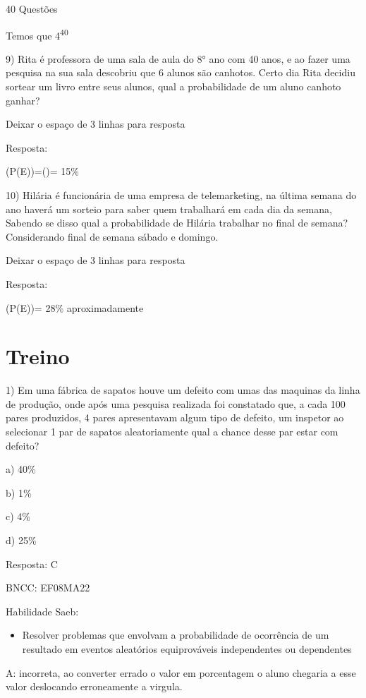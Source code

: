 40 Questões

Temos que 4\textsuperscript{40}

9) Rita é professora de uma sala de aula do 8° ano com 40 anos, e ao
fazer uma pesquisa na sua sala descobriu que 6 alunos são canhotos.
Certo dia Rita decidiu sortear um livro entre seus alunos, qual a
probabilidade de um aluno canhoto ganhar?

Deixar o espaço de 3 linhas para resposta

Resposta:

(P(E))=()= 15\%

10) Hilária é funcionária de uma empresa de telemarketing, na última
semana do ano haverá um sorteio para saber quem trabalhará em cada dia
da semana, Sabendo se disso qual a probabilidade de Hilária trabalhar no
final de semana? Considerando final de semana sábado e domingo.

Deixar o espaço de 3 linhas para resposta

Resposta:

(P(E))= 28\% aproximadamente

\section{Treino}

1) Em uma fábrica de sapatos houve um defeito com umas das maquinas da
linha de produção, onde após uma pesquisa realizada foi constatado que,
a cada 100 pares produzidos, 4 pares apresentavam algum tipo de defeito,
um inspetor ao selecionar 1 par de sapatos aleatoriamente qual a chance
desse par estar com defeito?

a) 40\%

b) 1\%

c) 4\%

d) 25\%

Resposta: C

BNCC: EF08MA22

Habilidade Saeb:

\begin{itemize}
\tightlist
\item
  Resolver problemas que envolvam a probabilidade de ocorrência de um
  resultado em eventos aleatórios equiprováveis independentes ou
  dependentes
\end{itemize}

A: incorreta, ao converter errado o valor em porcentagem o aluno
chegaria a esse valor deslocando erroneamente a virgula.


